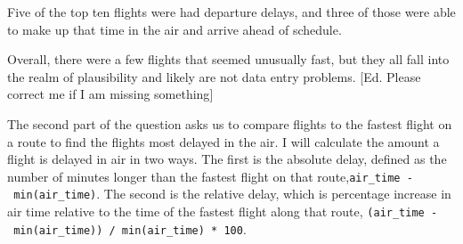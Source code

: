 \documentclass[]{book}
\newenvironment{Shaded}{\begin{snugshade}}{\end{snugshade}}
\newcommand{\CommentTok}[1]{\textcolor[rgb]{0.56,0.35,0.01}{\textit{#1}}}
\newcommand{\DataTypeTok}[1]{\textcolor[rgb]{0.13,0.29,0.53}{#1}}
\newcommand{\DecValTok}[1]{\textcolor[rgb]{0.00,0.00,0.81}{#1}}
\newcommand{\KeywordTok}[1]{\textcolor[rgb]{0.13,0.29,0.53}{\textbf{#1}}}
\newcommand{\NormalTok}[1]{#1}
\newcommand{\OperatorTok}[1]{\textcolor[rgb]{0.81,0.36,0.00}{\textbf{#1}}}
\newcommand{\StringTok}[1]{\textcolor[rgb]{0.31,0.60,0.02}{#1}}
\theoremstyle{plain}
\theoremstyle{remark}
\begin{document}
\begin{Shaded}
\end{Shaded}

Five of the top ten flights were had departure delays, and three of those were
able to make up that time in the air and arrive ahead of schedule.

Overall, there were a few flights that seemed unusually fast, but they all
fall into the realm of plausibility and likely are not data entry problems.
{[}Ed. Please correct me if I am missing something{]}

The second part of the question asks us to compare flights to the fastest flight
on a route to find the flights most delayed in the air. I will calculate the
amount a flight is delayed in air in two ways.
The first is the absolute delay, defined as the number of minutes longer than the fastest flight on
that route,\texttt{air\_time\ -\ min(air\_time)}.
The second is the relative delay, which is percentage increase in air time relative to the time of the fastest flight
along that route, \texttt{(air\_time\ -\ min(air\_time))\ /\ min(air\_time)\ *\ 100}.
\end{document}
